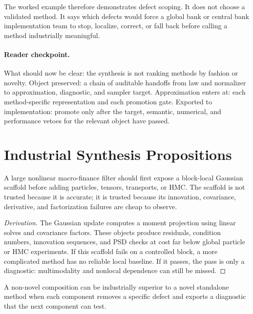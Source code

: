 The worked example therefore demonstrates defect scoping.  It does not choose
a validated method.  It says which defects would force a global bank or central
bank implementation team to stop, localize, correct, or fall back before
calling a method industrially meaningful.

\paragraph{Reader checkpoint.}
What should now be clear: the synthesis is not ranking methods by fashion or
novelty.  Object preserved: a chain of auditable handoffs from law and
normalizer to approximation, diagnostic, and sampler target.  Approximation
enters at: each method-specific representation and each promotion gate.
Exported to implementation: promote only after the target, semantic, numerical,
and performance vetoes for the relevant object have passed.

\section{Industrial Synthesis Propositions}
\label{sec:bf-hd-industrial-propositions}

\begin{proposition}
\label{prop:bf-hd-block-scaffold-first}
A large nonlinear macro-finance filter should first expose a block-local
Gaussian scaffold before adding particles, tensors, transports, or HMC.  The
scaffold is not trusted because it is accurate; it is trusted because its
innovation, covariance, derivative, and factorization failures are cheap to
observe.
\end{proposition}

\begin{proof}[Derivation]
The Gaussian update computes a moment projection using linear solves and
covariance factors.  These objects produce residuals, condition numbers,
innovation sequences, and PSD checks at cost far below global particle or HMC
experiments.  If this scaffold fails on a controlled block, a more complicated
method has no reliable local baseline.  If it passes, the pass is only a
diagnostic: multimodality and nonlocal dependence can still be missed.
\end{proof}

\begin{proposition}
\label{prop:bf-hd-useful-not-novel}
A non-novel composition can be industrially superior to a novel standalone
method when each component removes a specific defect and exports a diagnostic
that the next component can test.
\end{proposition}

